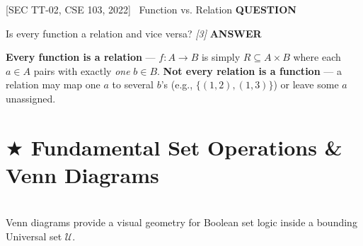 \documentclass[11pt,a4paper]{article}
\newcommand{\Qlabel}{\textbf{\color{navy}\footnotesize\MakeUppercase{Question}}\par\smallskip}
\newcommand{\Alabel}{\textbf{\color{teal}\footnotesize\MakeUppercase{Answer}}\par\smallskip}
\begin{document}
\begin{exambox}{[SEC TT-02, CSE 103, 2022] \ Function vs. Relation}
\Qlabel
Is every function a relation and vice versa? \hfill\textit{[3]}
\tcblower
\Alabel
\textbf{Every function is a relation} --- $f:A\to B$ is simply $R\subseteq A\times B$ where each $a\in A$ pairs with exactly \emph{one} $b\in B$. \quad
\textbf{Not every relation is a function} --- a relation may map one $a$ to several $b$'s (e.g., $\{(1,2),(1,3)\}$) or leave some $a$ unassigned.
\end{exambox}

\newpage
\section{\texorpdfstring{$\bigstar$ }{*}Fundamental Set Operations \& Venn Diagrams}
\\[4pt]

Venn diagrams provide a visual geometry for Boolean set logic inside a bounding Universal set $\mathcal{U}$.
\end{document}
